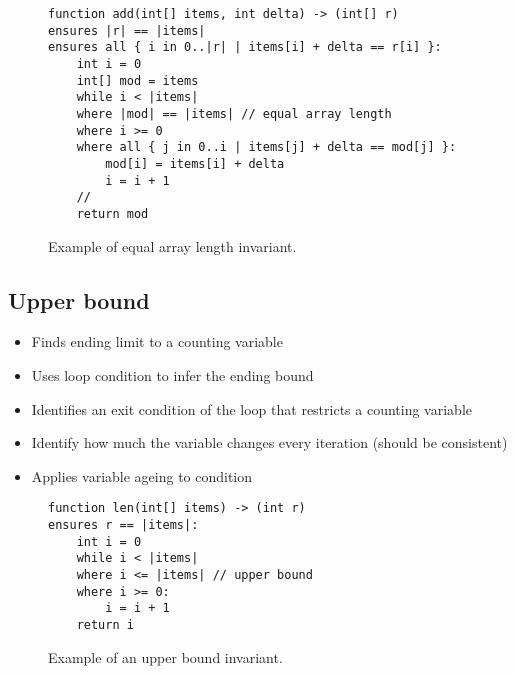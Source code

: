\begin{figure}[ht]
\begin{lstlisting}
function add(int[] items, int delta) -> (int[] r)
ensures |r| == |items|
ensures all { i in 0..|r| | items[i] + delta == r[i] }:
    int i = 0
    int[] mod = items
    while i < |items|
    where |mod| == |items| // equal array length
    where i >= 0
    where all { j in 0..i | items[j] + delta == mod[j] }:
        mod[i] = items[i] + delta
        i = i + 1
    //
    return mod
\end{lstlisting}
\caption{Example of equal array length invariant.}
\label{lst:array-length-eq}
\end{figure}

\subsection{Upper bound}


\begin{itemize}
	\item Finds ending limit to a counting variable
	\item Uses loop condition to infer the ending bound
	\item Identifies an exit condition of the loop that restricts a counting variable
	\item Identify how much the variable changes every iteration (should be consistent)
	\item Applies variable ageing to condition
\end{itemize}

\begin{figure}[ht]
\begin{lstlisting}
function len(int[] items) -> (int r)
ensures r == |items|:
    int i = 0
    while i < |items|
    where i <= |items| // upper bound
    where i >= 0:
        i = i + 1
    return i
\end{lstlisting}
\caption{Example of an upper bound invariant.}
\label{lst:upper-bound}
\end{figure}

